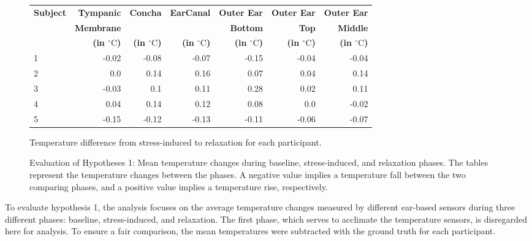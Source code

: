 \begin{figure}[t]
    \begin{subtable}{\textwidth}
        \centering
        \begin{tabular}{|l|rrrrrr|}
        \hline
        \textbf{Subject} & \textbf{Tympanic} & \textbf{Concha} & \textbf{EarCanal} & \textbf{Outer Ear} & \textbf{Outer Ear} & \textbf{Outer Ear} \\
             & \textbf{Membrane} &  &  & \textbf{Bottom} & \textbf{Top} & \textbf{Middle} \\   
             &\textbf{(in \(^\circ\text{C}\))} & \textbf{(in \(^\circ\text{C}\))} & \textbf{(in \(^\circ\text{C}\))} & \textbf{(in \(^\circ\text{C}\))} & \textbf{(in \(^\circ\text{C}\))} & \textbf{(in \(^\circ\text{C}\))} \\
        \hline
        1 & -0.02 & -0.08 & -0.07 & -0.15 & -0.04 & -0.04 \\
        2 & 0.0 & 0.14 & 0.16 & 0.07 & 0.04 & 0.14 \\
        3 & -0.03 & 0.1 & 0.11 & 0.28 & 0.02 & 0.11 \\
        4 & 0.04 & 0.14 & 0.12 & 0.08 & 0.0 & -0.02 \\
        5 & -0.15 & -0.12 & -0.13 & -0.11 & -0.06 & -0.07 \\
        \hline
        \end{tabular}
        \caption{Temperature difference from stress-induced to relaxation for each participant.}
        \label{subsec:Evaluation:Study2:Hypothesis1:temp_diff_stress_to_relax_all}
    \end{subtable} 
    \caption{Evaluation of Hypotheses 1: Mean temperature changes during baseline, stress-induced, and relaxation phases. The tables represent the temperature changes between the phases. A negative value implies a temperature fall between the two comparing phases, and a positive value implies a temperature rise, respectively.}
    \label{sec:Evaluation:Study2:Hypothesis1:Summary}
\end{figure}

To evaluate hypothesis 1, the analysis focuses on the average temperature changes measured by different ear-based sensors during three different phases: baseline, stress-induced, and relaxation. 
The first phase, which serves to acclimate the temperature sensors, is disregarded here for analysis.
To ensure a fair comparison, the mean temperatures were subtracted with the ground truth for each participant.

